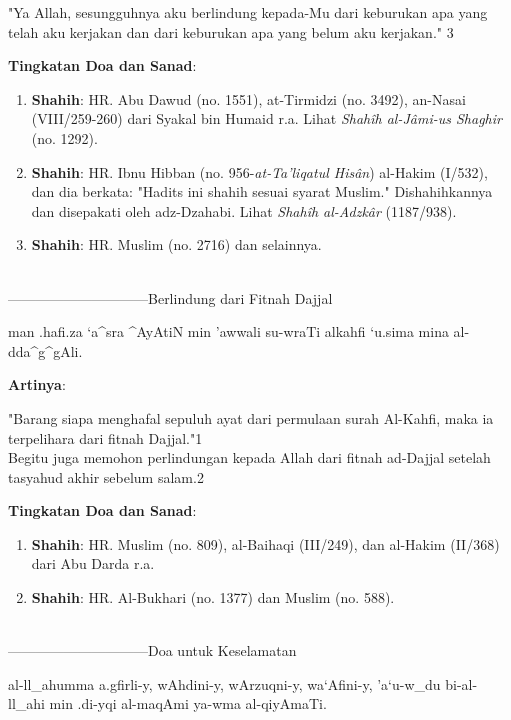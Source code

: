 \documentclass[a4paper,12pt]{article}
\begin{document}
\indent
"Ya Allah, sesungguhnya aku berlindung kepada-Mu dari keburukan apa yang 
telah aku kerjakan dan dari keburukan apa yang belum aku kerjakan."
{\scriptsize 3}\\
\par
\noindent
\textbf{Tingkatan Doa dan Sanad}:
\begin{enumerate}
\item \textbf{Shahih}: HR. Abu Dawud (no. 1551), at-Tirmidzi (no. 3492), 
an-Nasai (VIII/259-260) dari Syakal bin Humaid r.a. Lihat 
\textit{Shah\^{i}h al-J\^{a}mi-us Shaghir} (no. 1292).
\item \textbf{Shahih}: HR. Ibnu Hibban (no. 956-\textit{at-Ta'liqatul 
His\^{a}n}) al-Hakim (I/532), dan dia berkata: "Hadits ini shahih sesuai 
syarat Muslim." Dishahihkannya dan disepakati oleh adz-Dzahabi. Lihat 
\textit{Shah\^{i}h al-Adzk\^{a}r} (1187/938).
\item \textbf{Shahih}: HR. Muslim (no. 2716) dan selainnya.\\\\
\end{enumerate}
\par
{}------------------------------Berlindung dari Fitnah Dajjal
\begin{arabtext}
\noindent
man .hafi.za `a^sra ^AyAtiN min 'awwali su-wraTi alkahfi `u.sima mina 
al-dda^g^gAli.\\
\end{arabtext}
\noindent
\textbf{Artinya}:
\par
\indent
"Barang siapa menghafal sepuluh ayat dari permulaan surah Al-Kahfi, maka ia
terpelihara dari fitnah Dajjal."{\scriptsize 1}\\
\indent
Begitu juga memohon perlindungan kepada Allah dari fitnah ad-Dajjal setelah
tasyahud akhir sebelum salam.{\scriptsize 2}\\
\par
\noindent
\textbf{Tingkatan Doa dan Sanad}:
\begin{enumerate}
\item \textbf{Shahih}: HR. Muslim (no. 809), al-Baihaqi (III/249), dan 
al-Hakim (II/368) dari Abu Darda r.a.
\item \textbf{Shahih}: HR. Al-Bukhari (no. 1377) dan Muslim (no. 588).\\\\
\end{enumerate}
\par
{}------------------------------Doa untuk Keselamatan
\begin{arabtext}
\noindent
al-ll_ahumma a.gfirli-y, wAhdini-y, wArzuqni-y, wa`Afini-y, 'a`u-w_du 
bi-al-ll_ahi min .di-yqi al-maqAmi ya-wma al-qiyAmaTi.\\
\end{arabtext}
\end{document}
